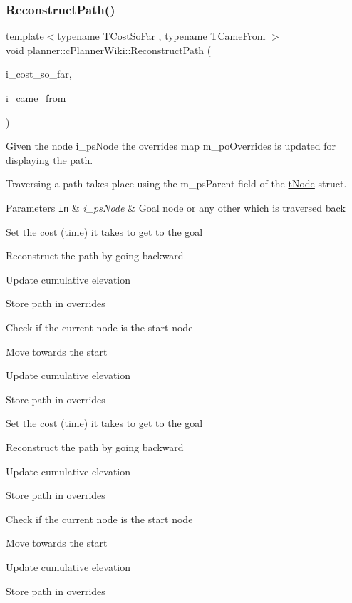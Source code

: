\subsubsection{\texorpdfstring{Reconstruct\+Path()}{ReconstructPath()}\hspace{0.1cm}{\footnotesize\ttfamily [1/2]}}
{\footnotesize\ttfamily template$<$typename T\+Cost\+So\+Far , typename T\+Came\+From $>$ \\
void planner\+::c\+Planner\+Wiki\+::\+Reconstruct\+Path (\begin{DoxyParamCaption}\item[{T\+Cost\+So\+Far \&\&}]{i\+\_\+cost\+\_\+so\+\_\+far,  }\item[{T\+Came\+From \&\&}]{i\+\_\+came\+\_\+from }\end{DoxyParamCaption})}



Given the node i\+\_\+ps\+Node the overrides map m\+\_\+po\+Overrides is updated for displaying the path. 

Traversing a path takes place using the m\+\_\+ps\+Parent field of the \mbox{\hyperlink{structplanner_1_1t_node}{t\+Node}} struct. 
\begin{DoxyParams}[1]{Parameters}
\mbox{\tt in}  & {\em i\+\_\+ps\+Node} & Goal node or any other which is traversed back \\
\hline
\end{DoxyParams}
Set the cost (time) it takes to get to the goal

Reconstruct the path by going backward

Update cumulative elevation

Store path in overrides

Check if the current node is the start node

Move towards the start

Update cumulative elevation

Store path in overrides

Set the cost (time) it takes to get to the goal

Reconstruct the path by going backward

Update cumulative elevation

Store path in overrides

Check if the current node is the start node

Move towards the start

Update cumulative elevation

Store path in overrides \mbox{\label{classplanner_1_1c_planner_wiki_a049e5c4a9540fecbe82a0648f771bbd2}} 
